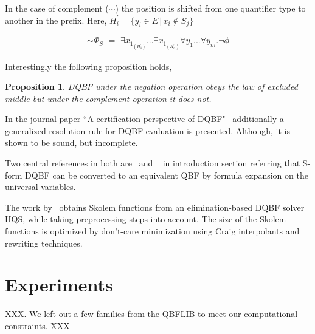 \documentclass[runningheads]{llncs}
\newtheorem{prop}{Proposition}
\begin{document}
In the case of complement ($\sim$) the position is shifted from one quantifier type to another in the prefix. Here, $H^{\prime}_{i} = \{ y_{i} \in E \, | \, x_{i} \notin S_{j} \}$

\begin{align}
\sim \Phi_{S} \,\, =   \,\, \exists x_{1_{(H^{\prime}_1)}}... \exists x_{1_{(H^{\prime}_n)}} \forall y_{1}...\forall y_{m} . \neg \phi \label{eq4}
\end{align}

Interestingly the following proposition holds, 
\begin{prop}
	DQBF under the negation operation obeys the law of excluded middle but under the complement operation it does not.
\end{prop} 

In the journal paper ``A certification perspective of DQBF"~\cite{balabanov2014henkin} additionally a generalized resolution rule for DQBF evaluation is presented. Although,  it is shown to be sound, but incomplete.

Two central references in both are~\cite{bubeck2006dependency} and ~\cite{bubeck2010model} in introduction section referring that S-form DQBF can be converted to an equivalent QBF by formula expansion on the universal variables.


The work by~\cite{wimmer2016skolem} obtains Skolem functions from an elimination-based DQBF solver HQS, while taking preprocessing steps into account.
%
The size of the Skolem functions is optimized by don’t-care minimization using Craig interpolants and rewriting techniques.


\section{Experiments}
\label{sec:experiments}

XXX.
We left out a few families from the QBFLIB to meet our computational constraints. XXX
\end{document}
